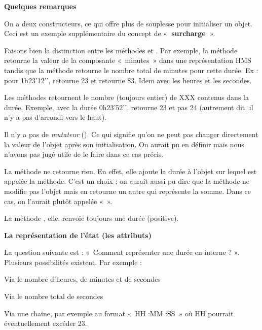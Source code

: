 \bigskip

{\bfseries
Quelques remarques}

\begin{liste}
	\item {
		On a deux constructeurs, ce qui offre plus de souplesse pour initialiser
		un objet. Ceci est un exemple supplémentaire du concept de
		«\textbf{~surcharge~}».}
	\item {
		Faisons bien la distinction entre les méthodes
		 et . Par
		exemple, la méthode  retourne la valeur
		de la composante «~minutes~» dans une représentation HMS tandis que la
		méthode  retourne le nombre total
		de minutes pour cette durée. Ex : pour 1h23’12’’,
		 retourne 23 et
		 retourne 83. Idem avec les heures
		et les secondes.}
	\item {
		Les méthodes  retournent le nombre
		(toujours entier) de XXX contenus dans la durée. Exemple, avec la durée
		0h23’52'’, 
		retourne 23 et pas 24 (autrement dit, il n’y a pas d’arrondi vers le
		haut).}
	\item {
		Il n’y a pas de \textit{mutateur }(). Ce qui
		signifie qu’on ne peut pas changer directement la valeur de l’objet
		après son initialisation. On aurait pu en définir mais nous
		n'avons pas jugé utile de le faire dans ce cas
		précis.}
	\item {
		La méthode  ne retourne rien. En effet,
		elle ajoute la durée à l’objet sur lequel est appelée la méthode. C’est
		un choix ; on aurait aussi pu dire que la méthode ne modifie pas
		l’objet mais en retourne un autre qui représente la somme. Dans ce cas,
		on l’aurait plutôt appelée «~».}
	\item {
		La méthode , elle, renvoie toujours une
		durée (positive).}
\end{liste}

{\sffamily\bfseries
La représentation de l'état (les attributs)}

La question suivante est : «~Comment représenter une durée en interne ?
». Plusieurs possibilités existent. Par exemple :

\begin{liste}
	\item 
		Via le nombre d’heures, de minutes et de secondes
	\item 
		Via le nombre total de secondes
	\item 
		Via une chaine, par exemple au format «~HH :MM :SS~» où HH pourrait
		éventuellement excéder 23.
\end{liste}

